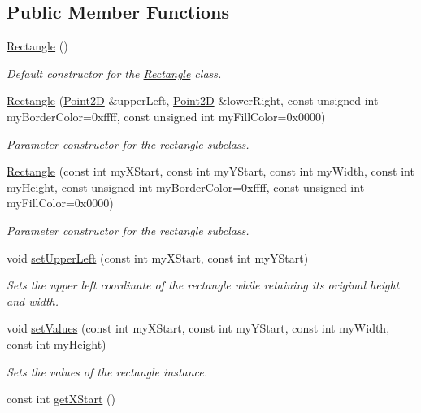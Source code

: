 \subsection*{Public Member Functions}
\begin{DoxyCompactItemize}
\item 
\hypertarget{class_rectangle_a8a933e0ebd9e80ce91e61ffe87fd577e}{\hyperlink{class_rectangle_a8a933e0ebd9e80ce91e61ffe87fd577e}{Rectangle} ()}\label{class_rectangle_a8a933e0ebd9e80ce91e61ffe87fd577e}

\begin{DoxyCompactList}\small\item\em Default constructor for the \hyperlink{class_rectangle}{Rectangle} class. \end{DoxyCompactList}\item 
\hyperlink{class_rectangle_aed472b7e14717bc8c58bcb18d557fb33}{Rectangle} (\hyperlink{class_point2_d}{Point2\+D} \&upper\+Left, \hyperlink{class_point2_d}{Point2\+D} \&lower\+Right, const unsigned int my\+Border\+Color=0xffff, const unsigned int my\+Fill\+Color=0x0000)
\begin{DoxyCompactList}\small\item\em Parameter constructor for the rectangle subclass. \end{DoxyCompactList}\item 
\hyperlink{class_rectangle_ade5eb36c0149b4e339ccc7e22ab8d25f}{Rectangle} (const int my\+X\+Start, const int my\+Y\+Start, const int my\+Width, const int my\+Height, const unsigned int my\+Border\+Color=0xffff, const unsigned int my\+Fill\+Color=0x0000)
\begin{DoxyCompactList}\small\item\em Parameter constructor for the rectangle subclass. \end{DoxyCompactList}\item 
void \hyperlink{class_rectangle_a35757bfba4460009975a276bab306f28}{set\+Upper\+Left} (const int my\+X\+Start, const int my\+Y\+Start)
\begin{DoxyCompactList}\small\item\em Sets the upper left coordinate of the rectangle while retaining its original height and width. \end{DoxyCompactList}\item 
void \hyperlink{class_rectangle_aa716ed3fddaebd1f13ad1e709642a494}{set\+Values} (const int my\+X\+Start, const int my\+Y\+Start, const int my\+Width, const int my\+Height)
\begin{DoxyCompactList}\small\item\em Sets the values of the rectangle instance. \end{DoxyCompactList}\item 
\hypertarget{class_rectangle_ae2e625affd41dcbb67fa9371cdb73169}{const int \hyperlink{class_rectangle_ae2e625affd41dcbb67fa9371cdb73169}{get\+X\+Start} ()}\label{class_rectangle_ae2e625affd41dcbb67fa9371cdb73169}


\end{DoxyCompactItemize}

